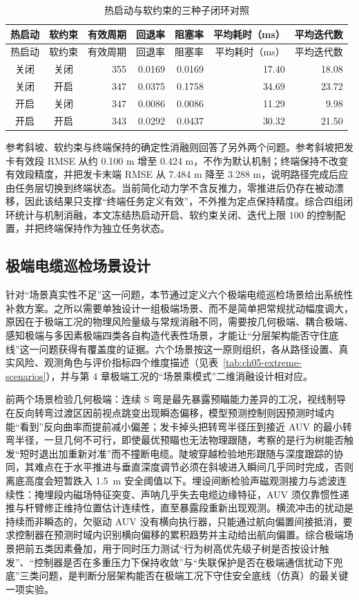 \begin{longtable}[]{@{}ccrrrrr@{}}
\caption{热启动与软约束的三种子闭环对照}\label{tab:ch05-r16-feasibility}\tabularnewline
\toprule\noalign{}
热启动 & 软约束 & 有效周期 & 回退率 & 阻塞率 & 平均耗时（ms） & 平均迭代数 \\
\midrule\noalign{}
\endfirsthead
\toprule\noalign{}
热启动 & 软约束 & 有效周期 & 回退率 & 阻塞率 & 平均耗时（ms） & 平均迭代数 \\
\midrule\noalign{}
\endhead
\bottomrule\noalign{}
\endlastfoot
关闭 & 关闭 & 355 & 0.0169 & 0.0169 & 17.40 & 18.08 \\
关闭 & 开启 & 347 & 0.0375 & 0.1758 & 34.69 & 23.72 \\
开启 & 关闭 & 347 & 0.0086 & 0.0086 & 11.29 & 9.98 \\
开启 & 开启 & 343 & 0.0292 & 0.0437 & 30.32 & 21.50 \\
\end{longtable}

参考斜坡、软约束与终端保持的确定性消融则回答了另外两个问题。参考斜坡把发卡有效段 RMSE 从约 0.100 m 增至 0.424 m，不作为默认机制；终端保持不改变有效段精度，并把发卡末端 RMSE 从 7.484 m 降至 3.288 m，说明路径完成后应由任务层切换到终端状态。当前简化动力学不含反推力，零推进后仍存在被动漂移，因此该结果只支撑``终端任务定义有效''，不外推为定点保持精度。综合四组闭环统计与机制消融，本文冻结热启动开启、软约束关闭、迭代上限 100 的控制配置，并把终端保持作为独立任务状态。


\subsection{极端电缆巡检场景设计}\label{sec:ch05-5-7}

针对``场景真实性不足''这一问题，本节通过定义六个极端电缆巡检场景给出系统性补救方案。之所以需要单独设计一组极端场景、而不是简单把常规扰动幅度调大，原因在于极端工况的物理风险量级与常规消融不同，需要按几何极端、耦合极端、感知极端与多因素极端四类各自构造代表性场景，才能让``分层架构能否守住底线''这一问题获得有覆盖度的证据。六个场景按这一原则组织，各从路径设置、真实风险、观测角色与评价指标四个维度描述（见表~\ref{tab:ch05-extreme-scenarios}），并与第 4 章极端工况的``场景乘模式''二维消融设计相对应。

前两个场景检验几何极端：连续 S 弯是最先暴露预瞄能力差异的工况，视线制导在反向转弯过渡区因前视点跳变出现瞬态偏移，模型预测控制则因预测时域内能``看到''反向曲率而提前减小偏差；发卡掉头把转弯半径压到接近 AUV 的最小转弯半径，一旦几何不可行，即使最优预瞄也无法物理跟随，考察的是行为树能否触发``短时退出加重新对准''而不撞断电缆。陡坡穿越检验地形跟随与深度跟踪的协同，其难点在于水平推进与垂直深度调节必须在斜坡进入瞬间几乎同时完成，否则离底高度会短暂跌入 1.5~m 安全阈值以下。埋设间断检验声磁观测接力与滤波连续性：掩埋段内磁场特征突变、声呐几乎失去电缆边缘特征，AUV 须仅靠惯性递推与杆臂修正维持位置估计连续性，直至暴露段重新出现观测。横流冲击的扰动是持续而非瞬态的，欠驱动 AUV 没有横向执行器，只能通过航向偏置间接抵消，要求控制器在预测时域内识别横向偏移的累积趋势并主动给出航向偏置。综合极端场景把前五类因素叠加，用于同时压力测试``行为树高优先级子树是否按设计触发''、``控制器是否在多重压力下保持收敛''与``失联保护是否在极端通信扰动下兜底''三类问题，是判断分层架构能否在极端工况下守住安全底线（仿真）的最关键一项实验。

